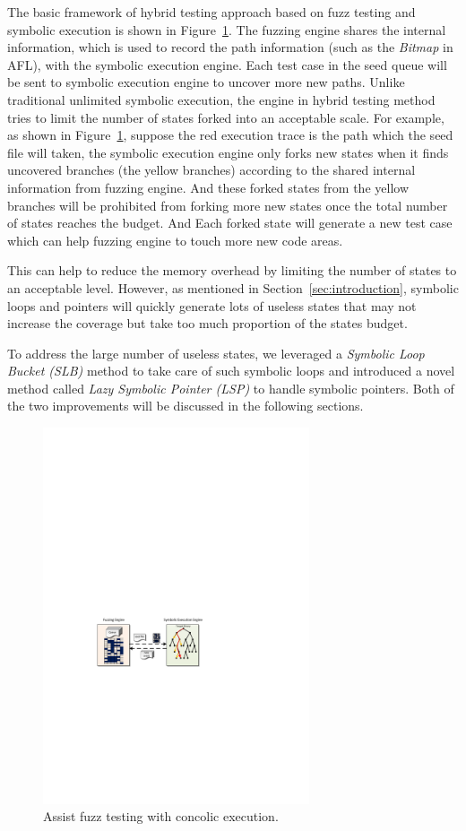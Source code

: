 The basic framework of hybrid testing approach based on fuzz testing and symbolic execution is shown in Figure~\ref{s2e-assist}. The fuzzing engine shares the internal information, which is used to record the path information (such as the \textit{Bitmap} in AFL), with the symbolic execution engine. 
Each test case in the seed queue will be sent to symbolic execution engine to uncover more new paths. 
Unlike traditional unlimited symbolic execution, the engine in hybrid testing method tries to limit the number of states forked into an acceptable scale. For example, as shown in Figure~\ref{s2e-assist}, suppose the red execution trace is the path which the seed file will taken, the symbolic execution engine only forks new states when it finds uncovered branches (the yellow branches) according to the shared internal information from fuzzing engine. And these forked states from the yellow branches will be prohibited from forking more new states once the total number of states reaches the budget. And Each forked state will generate a new test case which can help fuzzing engine to touch more new code areas. 

This can help to reduce the memory overhead by limiting the number of states to an acceptable level. However, as mentioned in Section~\ref{sec:introduction}, symbolic loops and pointers will quickly generate lots of useless states that may not increase the coverage but take too much proportion of the states budget.

To address the large number of useless states, we leveraged a \textit{Symbolic Loop Bucket (SLB)} method to take care of such symbolic loops and introduced a novel method called \textit{Lazy Symbolic Pointer (LSP)} to handle symbolic pointers. Both of the two improvements will be discussed in the following sections.

\begin{figure}
\centering
\includegraphics[width=0.7\textwidth]{figures/s2e-assist.pdf} 
\caption{Assist fuzz testing with concolic execution.}\label{s2e-assist}
\end{figure}


